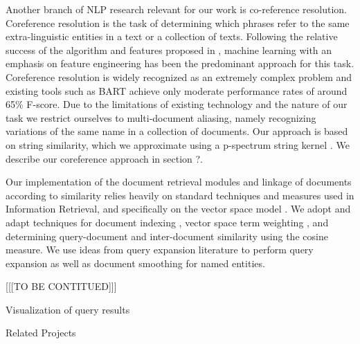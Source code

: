 Another branch of NLP research relevant for our work is co-reference resolution. Coreference resolution is the task of determining which phrases refer to the same extra-linguistic entities in a text or a collection of texts. Following the relative success of the algorithm and features proposed in \cite {soon2001coreference}, machine learning with an emphasis on feature engineering has been the predominant approach for this task. Coreference resolution is widely recognized as an extremely complex problem and existing tools such as BART \cite{bart} achieve only moderate performance rates of around 65\% F-score. Due to the limitations of existing technology and the nature of our task we restrict ourselves to multi-document aliasing, namely recognizing variations of the same name in a collection of documents. Our approach is based on string similarity, which we approximate using a p-spectrum string kernel \cite{kernels2004}. We describe our coreference approach in section ?.

Our implementation of the document retrieval modules and linkage of documents according to similarity relies heavily on standard techniques and measures used in Information Retrieval, and  specifically on the vector space model \cite{ir2008}. We adopt and adapt techniques for document indexing \cite{indexing1999}, vector space term weighting \cite{jones2004}, \cite{salton1971} and determining query-document and inter-document similarity using the cosine measure. We use ideas from query expansion literature \cite{xu1996} to perform query expansion as well as document smoothing for named entities. 

[[[TO BE CONTITUED]]]

Visualization of query results

Related Projects 


